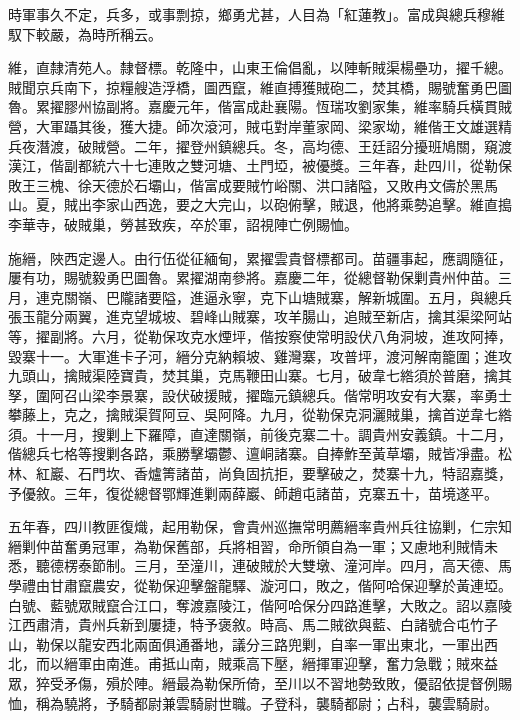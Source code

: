 \begin{pinyinscope}
時軍事久不定，兵多，或事剽掠，鄉勇尤甚，人目為「紅蓮教」。富成與總兵穆維馭下較嚴，為時所稱云。

維，直隸清苑人。隸督標。乾隆中，山東王倫倡亂，以陣斬賊渠楊壘功，擢千總。賊聞京兵南下，掠糧艘造浮橋，圖西竄，維直搏獲賊砲二，焚其橋，賜號奮勇巴圖魯。累擢膠州協副將。嘉慶元年，偕富成赴襄陽。恆瑞攻劉家集，維率騎兵橫貫賊營，大軍躡其後，獲大捷。師次滾河，賊屯對岸董家岡、梁家坳，維偕王文雄選精兵夜潛渡，破賊營。二年，擢登州鎮總兵。冬，高均德、王廷詔分擾班鳩關，窺渡漢江，偕副都統六十七連敗之雙河塘、土門埡，被優獎。三年春，赴四川，從勒保敗王三槐、徐天德於石壩山，偕富成要賊竹峪關、洪口諸隘，又敗冉文儔於黑馬山。夏，賊出李家山西逸，要之大完山，以砲俯擊，賊退，他將乘勢追擊。維直搗李華寺，破賊巢，勞甚致疾，卒於軍，詔視陣亡例賜恤。

施縉，陜西定邊人。由行伍從征緬甸，累擢雲貴督標都司。苗疆事起，應調隨征，屢有功，賜號毅勇巴圖魯。累擢湖南參將。嘉慶二年，從總督勒保剿貴州仲苗。三月，連克關嶺、巴隴諸要隘，進逼永寧，克下山塘賊寨，解新城圍。五月，與總兵張玉龍分兩翼，進克望城坡、碧峰山賊寨，攻羊腸山，追賊至新店，擒其渠梁阿站等，擢副將。六月，從勒保攻克水煙坪，偕按察使常明設伏八角洞坡，進攻阿捧，毀寨十一。大軍進卡子河，縉分克納賴坡、雞灣寨，攻普坪，渡河解南籠圍；進攻九頭山，擒賊渠陸寶貴，焚其巢，克馬鞭田山寨。七月，破韋七綹須於普磨，擒其孥，圍阿召山梁李景寨，設伏破援賊，擢臨元鎮總兵。偕常明攻安有大寨，率勇士攀藤上，克之，擒賊渠賀阿豆、吳阿降。九月，從勒保克洞灑賊巢，擒首逆韋七綹須。十一月，搜剿上下羅障，直達關嶺，前後克寨二十。調貴州安義鎮。十二月，偕總兵七格等搜剿各路，乘勝擊壩鬱、邅峒諸寨。自捧鮓至黃草壩，賊皆凈盡。松林、紅巖、石門坎、香爐箐諸苗，尚負固抗拒，要擊破之，焚寨十九，特詔嘉獎，予優敘。三年，復從總督鄂輝進剿兩薛巖、師趙屯諸苗，克寨五十，苗境遂平。

五年春，四川教匪復熾，起用勒保，會貴州巡撫常明薦縉率貴州兵往協剿，仁宗知縉剿仲苗奮勇冠軍，為勒保舊部，兵將相習，命所領自為一軍；又慮地利賊情未悉，聽德楞泰節制。三月，至潼川，連破賊於大雙墩、潼河岸。四月，高天德、馬學禮由甘肅竄農安，從勒保迎擊盤龍驛、漩河口，敗之，偕阿哈保迎擊於黃連埡。白號、藍號眾賊竄合江口，奪渡嘉陵江，偕阿哈保分四路進擊，大敗之。詔以嘉陵江西肅清，貴州兵新到屢捷，特予褒敘。時高、馬二賊欲與藍、白諸號合屯竹子山，勒保以龍安西北兩面俱通番地，議分三路兜剿，自率一軍出東北，一軍出西北，而以縉軍由南進。甫抵山南，賊乘高下壓，縉揮軍迎擊，奮力急戰；賊來益眾，猝受矛傷，殞於陣。縉最為勒保所倚，至川以不習地勢致敗，優詔依提督例賜恤，稱為驍將，予騎都尉兼雲騎尉世職。子登科，襲騎都尉；占科，襲雲騎尉。


\end{pinyinscope}
